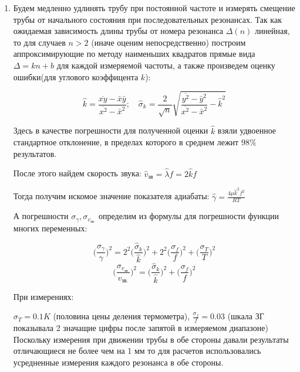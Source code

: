 \documentclass[10pt]{article}
\begin{document}
    \begin{enumerate}
    \item 
         Будем медленно удлинять трубу при постоянной частоте и измерять смещение трубы от начального состояния при последовательных резонансах.
    Так как ожидаемая зависимость длины трубы от номера резонанса $\Delta(n)$ линейная, то для случаев $n > 2$ (иначе оценим непосредственно) построим аппроксимирующие по методу наименьших квадратов прямые вида $\Delta = kn + b$ для каждой измеряемой частоты, а также произведем оценку ошибки(для углового коэффицента $k$):

    \begin{equation}
        \hat{k} = \frac{\overline{xy} - \bar{x}\bar{y}}{\overline{x^2} - \bar{x}^2} ;\quad \hat{\sigma}_k = \frac{2}{\sqrt{n}}\sqrt{\frac{\overline{y^2} - \bar{y}^2}{\overline{x^2} - \bar{x}^2} - \hat{k}^2}
    \end{equation}

    Здесь в качестве погрешности для полученной оценки $\hat{k}$  взяли удвоенное стандартное отклонение, в пределах которого в среднем лежит $98\%$ результатов.

    После этого найдем скорость звука: $\hat{v}_\text{зв} = \hat{\lambda} f = 2 \hat{k} f$

    Тогда получим искомое значение показателя адиабаты: $\hat{\gamma} = \frac{4\mu \hat{k}^2 f^2}{RT}$ 

    А погрешности $\sigma_\gamma, \sigma_{v_\text{зв.}}$ определим из формулы для погрешности функции многих переменных:

    \begin{equation}
        \bigg(\frac{\sigma_\gamma}{\gamma}\bigg) ^ 2 =    2^2 \bigg(\frac{\hat{\sigma}_k}{\hat{k}}\bigg) ^ 2 + 2^2 \bigg(\frac{\sigma_f}{f}\bigg) ^ 2 + \bigg(\frac{\sigma_T}{T}\bigg) ^ 2 
    \end{equation}
    \begin{equation}
        \bigg(\frac{\sigma_{v_\text{зв.}}}{v_\text{зв.}}\bigg) ^ 2 =    \bigg(\frac{\hat{\sigma}_k}{\hat{k}}\bigg) ^ 2 + \bigg(\frac{\sigma_f}{f}\bigg) ^ 2
    \end{equation}


    При измерениях:

        $\sigma_T = 0.1 K$ (половина цены деления термометра), $ \frac{\sigma_f}{f} = 0.03 $ (шкала ЗГ показывала 2 значащие цифры после запятой в измеряемом диапазоне)
        Поскольку измерения при движении трубы в обе стороны давали результаты отличающиеся не более чем на 1 мм то для расчетов использовались усредненные измерения каждого резонанса в обе стороны. 
  

\end{enumerate}
\end{document}
